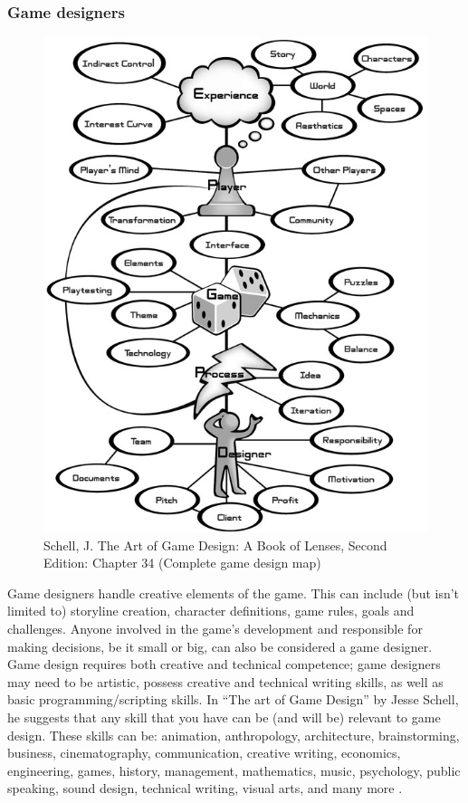 \documentclass[../main.tex]{subfiles}
\begin{document}
\subsubsection{Game designers}
\begin{figure}[ht]
\centering
\includegraphics[scale=0.45]{images/chapter1/The Art of Game Design: A Book of Lenses, Second Edition: Chapter 34.png}
\caption{Schell, J. The Art of Game Design: A Book of Lenses, Second Edition: Chapter 34 (Complete game design map)}
\label{fig:Schell, J. The Art of Game Design: A Book of Lenses, Second Edition: Chapter 34 (Complete game design map)}
\end{figure}
Game designers handle creative elements of the game. This can include (but isn’t limited to) storyline creation, character definitions, game rules, goals and challenges. Anyone involved in the game’s development and responsible for making decisions, be it small or big, can also be considered a game designer. Game design requires both creative and technical competence; game designers may need to be artistic, possess creative and technical writing skills, as well as basic programming/scripting skills. In “The art of Game Design” by Jesse Schell, he suggests that any skill that you have can be (and will be) relevant to game design. These skills can be: animation, anthropology, architecture, brainstorming, business, cinematography, communication, creative writing, economics, engineering, games, history, management, mathematics, music, psychology, public speaking, sound design, technical writing, visual arts, and many more \cite{14}.
\end{document}
